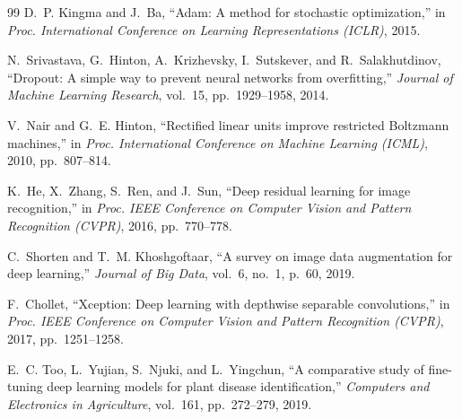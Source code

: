 \documentclass[conference]{IEEEtran}
\begin{document}
\begin{thebibliography}{99}
D.~P. Kingma and J.~Ba, ``Adam: A method for stochastic optimization,'' in \textit{Proc. International Conference on Learning Representations (ICLR)}, 2015.

N.~Srivastava, G.~Hinton, A.~Krizhevsky, I.~Sutskever, and R.~Salakhutdinov, ``Dropout: A simple way to prevent neural networks from overfitting,'' \textit{Journal of Machine Learning Research}, vol.~15, pp.~1929--1958, 2014.

V.~Nair and G.~E. Hinton, ``Rectified linear units improve restricted Boltzmann machines,'' in \textit{Proc. International Conference on Machine Learning (ICML)}, 2010, pp.~807--814.

K.~He, X.~Zhang, S.~Ren, and J.~Sun, ``Deep residual learning for image recognition,'' in \textit{Proc. IEEE Conference on Computer Vision and Pattern Recognition (CVPR)}, 2016, pp.~770--778.

C.~Shorten and T.~M. Khoshgoftaar, ``A survey on image data augmentation for deep learning,'' \textit{Journal of Big Data}, vol.~6, no.~1, p.~60, 2019.

F.~Chollet, ``Xception: Deep learning with depthwise separable convolutions,'' in \textit{Proc. IEEE Conference on Computer Vision and Pattern Recognition (CVPR)}, 2017, pp.~1251--1258.

E.~C. Too, L.~Yujian, S.~Njuki, and L.~Yingchun, ``A comparative study of fine-tuning deep learning models for plant disease identification,'' \textit{Computers and Electronics in Agriculture}, vol.~161, pp.~272--279, 2019.

\end{thebibliography}
\end{document}
